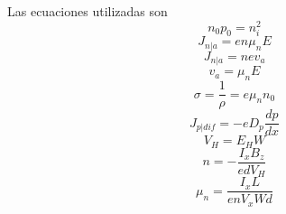 \documentclass[12pt,a4paper]{article}
\begin{document}
Las ecuaciones utilizadas son
\begin{equation}
n_{0}p_{0}=n_{i}^{2}
\end{equation}
\begin{equation}
J_{n|a}=en \mu _{n} E
\end{equation}
\begin{equation}
J_{n|a}=nev_{a}
\end{equation}
\begin{equation}
v_{a}=\mu _{n} E
\end{equation}
\begin{equation}
\sigma = \frac{1}{\rho} = e \mu _{n} n_{0}
\end{equation}
\begin{equation}
J_{p|dif}=-eD_{p}\frac{dp}{dx}
\end{equation}
\begin{equation}
V_{H}=E_{H}W
\end{equation}
\begin{equation}
n=-\frac{I_{x}B_{z}}{edV_{H}}
\end{equation}
\begin{equation}
\mu _{n}=\frac{I_{x}L}{enV_{x}Wd}
\end{equation}
\end{document}
